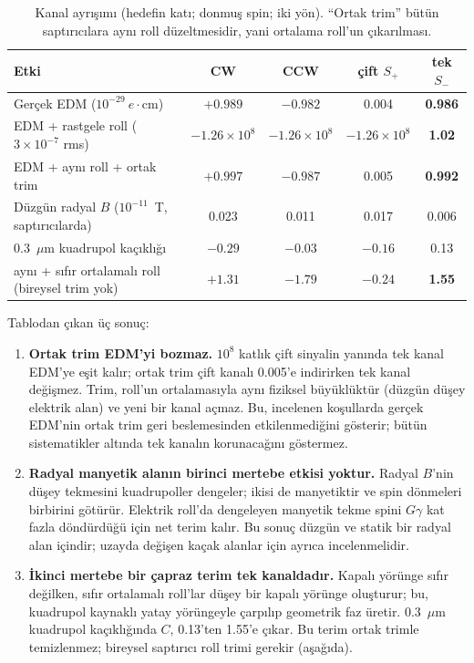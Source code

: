 \documentclass[11pt,a4paper]{article}
\begin{document}
\begin{table}[H]\centering\small
\footnotesize\caption{Kanal ayrışımı (hedefin katı; donmuş spin; iki yön). ``Ortak trim'' bütün saptırıcılara aynı roll
düzeltmesidir, yani ortalama roll'un çıkarılması.}\label{tab:kanal}
\begin{tabular}{lcccc}\toprule
Etki & CW & CCW & çift $S_+$ & tek $S_-$\\\midrule
Gerçek EDM ($10^{-29}~e\cdot$cm) & $+0.989$ & $-0.982$ & 0.004 & \textbf{0.986}\\
EDM + rastgele roll ($3\times10^{-7}$ rms) & $-1.26\times10^8$ & $-1.26\times10^8$ & $-1.26\times10^8$ & \textbf{1.02}\\
EDM + aynı roll + ortak trim & $+0.997$ & $-0.987$ & 0.005 & \textbf{0.992}\\
Düzgün radyal $B$ ($10^{-11}$~T, saptırıcılarda) & 0.023 & 0.011 & 0.017 & 0.006\\
0.3~$\mu$m kuadrupol kaçıklığı & $-0.29$ & $-0.03$ & $-0.16$ & 0.13\\
aynı + sıfır ortalamalı roll (bireysel trim yok) & $+1.31$ & $-1.79$ & $-0.24$ & \textbf{1.55}\\\bottomrule
\end{tabular}
\end{table}

Tablodan çıkan üç sonuç:
\begin{enumerate}
\item \textbf{Ortak trim EDM'yi bozmaz.} $10^8$ katlık çift sinyalin yanında tek kanal EDM'ye eşit kalır; ortak
trim çift kanalı 0.005'e indirirken tek kanal değişmez. Trim, roll'un ortalamasıyla aynı fiziksel büyüklüktür
(düzgün düşey elektrik alan) ve yeni bir kanal açmaz. Bu, incelenen koşullarda gerçek EDM'nin ortak trim geri
beslemesinden etkilenmediğini gösterir; bütün sistematikler altında tek kanalın korunacağını göstermez.
\item \textbf{Radyal manyetik alanın birinci mertebe etkisi yoktur.} Radyal $B$'nin düşey tekmesini kuadrupoller
dengeler; ikisi de manyetiktir ve spin dönmeleri birbirini götürür. Elektrik roll'da dengeleyen manyetik tekme
spini $G\gamma$ kat fazla döndürdüğü için net terim kalır. Bu sonuç düzgün ve statik bir radyal alan içindir;
uzayda değişen kaçak alanlar için ayrıca incelenmelidir.
\item \textbf{İkinci mertebe bir çapraz terim tek kanaldadır.} Kapalı yörünge sıfır değilken, sıfır ortalamalı
roll'lar düşey bir kapalı yörünge oluşturur; bu, kuadrupol kaynaklı yatay yörüngeyle çarpılıp geometrik faz
üretir. 0.3~$\mu$m kuadrupol kaçıklığında $C$, 0.13'ten 1.55'e çıkar. Bu terim ortak trimle temizlenmez; bireysel
saptırıcı roll trimi gerekir (aşağıda).
\end{enumerate}
\end{document}

